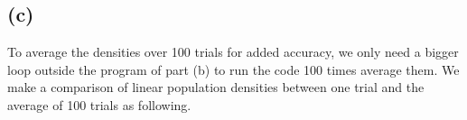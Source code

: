 \documentclass{article}
\begin{document}
\begin{figure}[!ht]
	\centering
\end{figure}
\bigskip
\subsection{(c)}
To average the densities over 100 trials for added accuracy, we only need a bigger loop outside the program of part (b) to run the code 100 times average them. We make a comparison of linear population densities between one trial and the average of 100 trials as following.
\begin{figure}[!ht]
	\centering
\end{figure}
\end{document}
